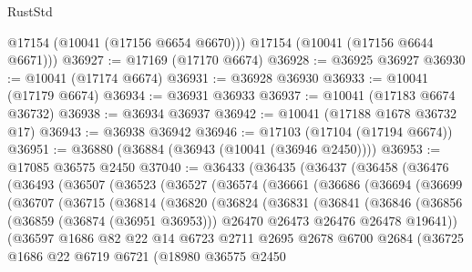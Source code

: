 \begin{lexlean}{RustStd}
\begin{coremodule}
        @17154
        (@10041 (@17156 @6654 @6670)))
      @17154
      (@10041 (@17156 @6644 @6671)))
@36927 := @17169 (@17170 @6674)
@36928 := @36925 @36927
@36930 := @10041 (@17174 @6674)
@36931 := @36928 @36930
@36933 := @10041 (@17179 @6674)
@36934 := @36931 @36933
@36937 := @10041 (@17183 @6674 @36732)
@36938 := @36934 @36937
@36942 := @10041 (@17188 @1678 @36732 @17)
@36943 := @36938 @36942
@36946 := @17103 (@17104 (@17194 @6674))
@36951 := @36880 (@36884 (@36943 (@10041 (@36946 @2450))))
@36953 := @17085 @36575 @2450
@37040 := @36433
    (@36435
      (@36437
        (@36458
          (@36476
            (@36493
              (@36507
                (@36523
                  (@36527
                    (@36574
                      (@36661
                        (@36686
                          (@36694
                            (@36699
                              (@36707
                                (@36715
                                  (@36814
                                    (@36820
                                      (@36824
                                        (@36831
                                          (@36841
                                            (@36846
                                              (@36856
                                                (@36859 (@36874 (@36951 @36953)))
                                                @26470
                                                @26473
                                                @26476
                                                @26478
                                                @19641))
                                            (@36597
                                              @1686
                                              @82
                                              @22
                                              @14
                                              @6723
                                              @2711
                                              @2695
                                              @2678
                                              @6700
                                              @2684
                                              (@36725
                                                @1686
                                                @22
                                                @6719
                                                @6721
                                                (@18980
                                                  @36575
                                                  @2450

\end{coremodule}
\end{lexlean}

